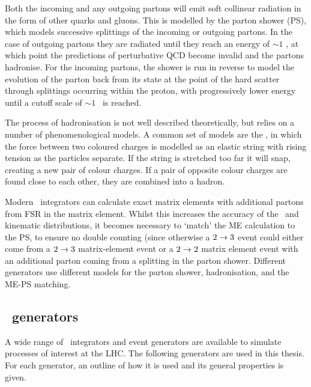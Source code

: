 Both the incoming and any outgoing partons will emit soft collinear radiation in the form of other quarks and gluons. This is
modelled by the parton shower (PS), which models successive splittings of the
incoming or outgoing partons. In the case of outgoing partons they are radiated
until they reach an energy of $\sim 1$ \gev, at
which point the predictions of perturbative QCD become invalid and the partons
hadronise. For the incoming partons, the
shower is run in reverse to model the evolution of the parton back from its state
at the point of the hard scatter through splittings occurring within the proton,
with progressively lower energy until a cutoff scale of $\sim 1$ \gev\ is reached.

The process of hadronisation is not well described theoretically,
but relies on a number of phenomenological models. A common set of models are
the , in which the
force between two coloured charges is modelled as an elastic string with
rising tension as the particles separate. If the string is stretched too far
it will snap, creating a new pair of colour charges. If a pair of opposite
colour charges are found close to each other, they are combined into a hadron.

Modern \mc\ integrators can calculate exact matrix elements with additional
partons from FSR in the matrix element. Whilst this increases the accuracy of
the \cx\ and kinematic distributions, it becomes necessary to `match' the
ME calculation to the PS, to ensure no double counting (since otherwise a
$2\rightarrow3$ event could either come from a $2\rightarrow3$ matrix-element event or a $2\rightarrow2$
matrix element event with an additional parton coming from a splitting in the
parton shower. Different generators use different models for the parton
shower, hadronisation, and the ME-PS matching.

\subsection{\mc\ generators}
\label{sec:Theory-MC-gen}

A wide range of \mc\ integrators and event generators are available to simulate
processes of interest at the LHC. The
following generators are used in this thesis. For each generator, an outline of
how it is used and its general properties is given.


